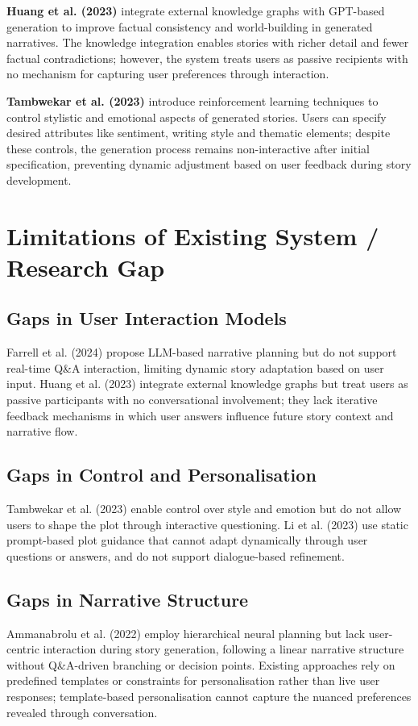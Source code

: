 \textbf{Huang et al. (2023)} \cite{huang2023knowledge} integrate
external knowledge graphs with GPT-based generation to improve
factual consistency and world-building in generated narratives. The
knowledge integration enables stories with richer detail and fewer
factual contradictions; however, the system treats users as passive
recipients with no mechanism for capturing user preferences through
interaction.

\textbf{Tambwekar et al. (2023)} \cite{tambwekar2023controllable}
introduce reinforcement learning techniques to control stylistic and
emotional aspects of generated stories. Users can specify desired
attributes like sentiment, writing style and thematic elements;
despite these controls, the generation process remains non-interactive
after initial specification, preventing dynamic adjustment based on
user feedback during story development.

\section{Limitations of Existing System / Research Gap}
\label{sec:gap}

\subsection{Gaps in User Interaction Models}
Farrell et al. (2024) propose LLM-based narrative planning but do
not support real-time Q\&A interaction, limiting dynamic story
adaptation based on user input. Huang et al. (2023) integrate
external knowledge graphs but treat users as passive participants
with no conversational involvement; they lack iterative feedback
mechanisms in which user answers influence future story context
and narrative flow.

\subsection{Gaps in Control and Personalisation}
Tambwekar et al. (2023) enable control over style and emotion but do
not allow users to shape the plot through interactive questioning.
Li et al. (2023) use static prompt-based plot guidance that cannot
adapt dynamically through user questions or answers, and do not
support dialogue-based refinement.

\subsection{Gaps in Narrative Structure}
Ammanabrolu et al. (2022) employ hierarchical neural planning but
lack user-centric interaction during story generation, following a
linear narrative structure without Q\&A-driven branching or decision
points. Existing approaches rely on predefined templates or
constraints for personalisation rather than live user responses;
template-based personalisation cannot capture the nuanced preferences
revealed through conversation.

